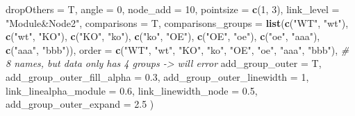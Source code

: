 \documentclass[
]{book}
\newenvironment{Shaded}{\begin{snugshade}}{\end{snugshade}}
\newcommand{\AttributeTok}[1]{\textcolor[rgb]{0.13,0.29,0.53}{#1}}
\newcommand{\CommentTok}[1]{\textcolor[rgb]{0.56,0.35,0.01}{\textit{#1}}}
\newcommand{\DecValTok}[1]{\textcolor[rgb]{0.00,0.00,0.81}{#1}}
\newcommand{\FloatTok}[1]{\textcolor[rgb]{0.00,0.00,0.81}{#1}}
\newcommand{\FunctionTok}[1]{\textcolor[rgb]{0.13,0.29,0.53}{\textbf{#1}}}
\newcommand{\NormalTok}[1]{#1}
\newcommand{\StringTok}[1]{\textcolor[rgb]{0.31,0.60,0.02}{#1}}
\begin{document}
\begin{Shaded}
\begin{Highlighting}[]
  \AttributeTok{dropOthers                   =}\NormalTok{ T,}
  \AttributeTok{angle                        =} \DecValTok{0}\NormalTok{,}
  \AttributeTok{node\_add                     =} \DecValTok{10}\NormalTok{,}
  \AttributeTok{pointsize                    =} \FunctionTok{c}\NormalTok{(}\DecValTok{1}\NormalTok{, }\DecValTok{3}\NormalTok{),}
  \AttributeTok{link\_level                   =} \StringTok{"Module\&Node2"}\NormalTok{,}
  \AttributeTok{comparisons                  =}\NormalTok{ T,}
  \AttributeTok{comparisons\_groups           =} \FunctionTok{list}\NormalTok{(}\FunctionTok{c}\NormalTok{(}\StringTok{"WT"}\NormalTok{, }\StringTok{"wt"}\NormalTok{),}
                                      \FunctionTok{c}\NormalTok{(}\StringTok{"wt"}\NormalTok{, }\StringTok{"KO"}\NormalTok{),}
                                      \FunctionTok{c}\NormalTok{(}\StringTok{"KO"}\NormalTok{, }\StringTok{"ko"}\NormalTok{),}
                                      \FunctionTok{c}\NormalTok{(}\StringTok{"ko"}\NormalTok{, }\StringTok{"OE"}\NormalTok{),}
                                      \FunctionTok{c}\NormalTok{(}\StringTok{"OE"}\NormalTok{, }\StringTok{"oe"}\NormalTok{),}
                                      \FunctionTok{c}\NormalTok{(}\StringTok{"oe"}\NormalTok{, }\StringTok{"aaa"}\NormalTok{),}
                                      \FunctionTok{c}\NormalTok{(}\StringTok{"aaa"}\NormalTok{, }\StringTok{"bbb"}\NormalTok{)),}
  \AttributeTok{order                        =} \FunctionTok{c}\NormalTok{(}\StringTok{"WT"}\NormalTok{, }\StringTok{"wt"}\NormalTok{, }\StringTok{"KO"}\NormalTok{, }\StringTok{"ko"}\NormalTok{, }\StringTok{"OE"}\NormalTok{, }\StringTok{"oe"}\NormalTok{, }\StringTok{"aaa"}\NormalTok{, }\StringTok{"bbb"}\NormalTok{), }\CommentTok{\# 8 names, but data only has 4 groups {-}\textgreater{} will error}
  \AttributeTok{add\_group\_outer              =}\NormalTok{ T,}
  \AttributeTok{add\_group\_outer\_fill\_alpha   =} \FloatTok{0.3}\NormalTok{,}
  \AttributeTok{add\_group\_outer\_linewidth    =} \DecValTok{1}\NormalTok{,}
  \AttributeTok{link\_linealpha\_module        =} \FloatTok{0.6}\NormalTok{,}
  \AttributeTok{link\_linewidth\_node          =} \FloatTok{0.5}\NormalTok{,}
  \AttributeTok{add\_group\_outer\_expand       =} \FloatTok{2.5}
\NormalTok{)}
\end{Highlighting}
\end{Shaded}
\end{document}
